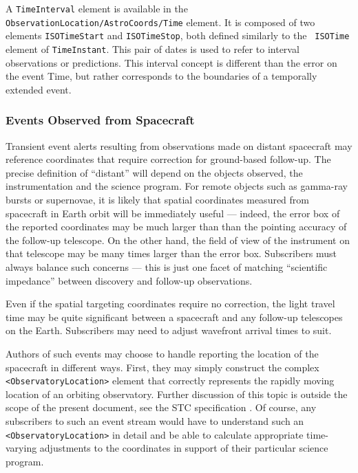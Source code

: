 \documentclass[11pt,a4paper]{ivoa}
\begin{document}
A \texttt{TimeInterval} element is available in the \texttt{
ObservationLocation/AstroCoords/Time} element. It is composed of two elements 
\texttt{ISOTimeStart} and \texttt{ISOTimeStop}, both defined similarly to the \texttt{
ISOTime} element of \texttt{TimeInstant}. This pair of dates is used to refer to 
interval observations or predictions. This interval concept is different than 
the error on the event Time, but rather corresponds to the boundaries of a 
temporally extended event. 

\subsubsection{Events Observed from Spacecraft}
\label{sec:3.4.5}
Transient event alerts resulting from observations made on distant spacecraft
may reference coordinates that require correction for ground-based follow-up.
The precise definition of ``distant'' will depend on the objects observed, the
instrumentation and the science program. For remote objects such as gamma-ray
bursts or supernovae, it is likely that spatial coordinates measured from
spacecraft in Earth orbit will be immediately useful --- indeed, the error box
of the reported coordinates may be much larger than than the pointing accuracy
of the follow-up telescope. On the other hand, the field of view of the
instrument on that telescope may be many times larger than the error box.
Subscribers must always balance such concerns --- this is just one facet of
matching ``scientific impedance'' between discovery and follow-up observations.

Even if the spatial targeting coordinates require no correction, the light
travel time may be quite significant between a spacecraft and any follow-up
telescopes on the Earth. Subscribers may need to adjust wavefront arrival times
to suit.

Authors of such events may choose to handle reporting the location of the 
spacecraft in different ways. First, they may simply construct the complex \texttt{
<ObservatoryLocation>} element that correctly represents the rapidly moving 
location of an orbiting observatory. Further discussion of this topic is outside 
the scope of the present document, see the STC specification 
\citep{2007ivoa.spec.1030R}. Of course, any subscribers to such an event stream 
would have to understand such an \texttt{<ObservatoryLocation>} in detail and be 
able to calculate appropriate time-varying adjustments to the coordinates in 
support of their particular science program. 
\end{document}
